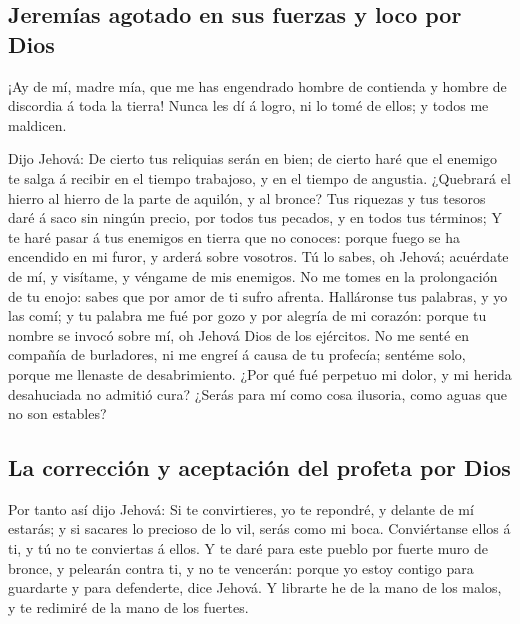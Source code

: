 \hypertarget{jeremuxedas-agotado-en-sus-fuerzas-y-loco-por-dios}{%
\subsection{Jeremías agotado en sus fuerzas y loco por
Dios}\label{jeremuxedas-agotado-en-sus-fuerzas-y-loco-por-dios}}

 ¡Ay de mí, madre mía, que me has engendrado hombre de
contienda y hombre de discordia á toda la tierra! Nunca les dí á logro,
ni lo tomé de ellos; y todos me maldicen.

 Dijo Jehová: De cierto tus reliquias serán en bien; de
cierto haré que el enemigo te salga á recibir en el tiempo trabajoso, y
en el tiempo de angustia.  ¿Quebrará el hierro al hierro
de la parte de aquilón, y al bronce?  Tus riquezas y tus
tesoros daré á saco sin ningún precio, por todos tus pecados, y en todos
tus términos;  Y te haré pasar á tus enemigos en tierra
que no conoces: porque fuego se ha encendido en mi furor, y arderá sobre
vosotros.  Tú lo sabes, oh Jehová; acuérdate de mí, y
visítame, y véngame de mis enemigos. No me tomes en la prolongación de
tu enojo: sabes que por amor de ti sufro afrenta. 
Halláronse tus palabras, y yo las comí; y tu palabra me fué por gozo y
por alegría de mi corazón: porque tu nombre se invocó sobre mí, oh
Jehová Dios de los ejércitos.  No me senté en compañía de
burladores, ni me engreí á causa de tu profecía; sentéme solo, porque me
llenaste de desabrimiento.  ¿Por qué fué perpetuo mi
dolor, y mi herida desahuciada no admitió cura? ¿Serás para mí como cosa
ilusoria, como aguas que no son estables?

\hypertarget{la-correcciuxf3n-y-aceptaciuxf3n-del-profeta-por-dios}{%
\subsection{La corrección y aceptación del profeta por
Dios}\label{la-correcciuxf3n-y-aceptaciuxf3n-del-profeta-por-dios}}

 Por tanto así dijo Jehová: Si te convirtieres, yo te
repondré, y delante de mí estarás; y si sacares lo precioso de lo vil,
serás como mi boca. Conviértanse ellos á ti, y tú no te conviertas á
ellos.  Y te daré para este pueblo por fuerte muro de
bronce, y pelearán contra ti, y no te vencerán: porque yo estoy contigo
para guardarte y para defenderte, dice Jehová.  Y
librarte he de la mano de los malos, y te redimiré de la mano de los
fuertes.


